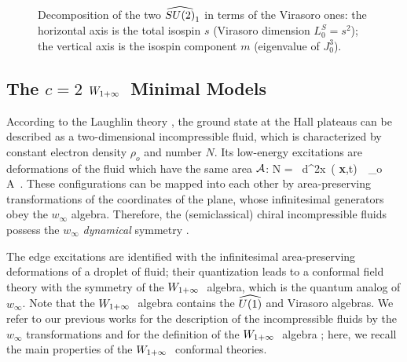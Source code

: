 \begin{figure}
\epsfxsize=10cm \centerline{}
\vspace{1cm}
\epsfxsize=10cm \centerline{}
\caption{Decomposition of the two $\su2$ \reps in terms of the Virasoro ones:
the horizontal axis is the
total isospin $s$ (Virasoro dimension $L_0^S=s^2$); the vertical axis 
is the isospin component $m$ (eigenvalue of $J^3_0$).}
\label{fig1}
\end{figure}




\subsection{The $c=2$ $W_{1+\infty}\ $ Minimal Models}

According to the Laughlin theory \cite{laugh}, 
the ground state at the Hall plateaus
can be described as a two-dimensional incompressible fluid, which is
characterized by constant electron density $\rho_o$
and number $N$. Its low-energy excitations are deformations
of the fluid which have the same area ${\cal A}$:
\beq
N = \int \ d^2x\ \rho \left( {\bf x},t\right)\ \approx\ \rho_o {\cal A}\ .
\label{keyeq}\eeq
These configurations 
can be mapped into each other by area-preserving transformations
of the coordinates of the plane, whose infinitesimal generators 
obey the $w_\infty$ algebra.
Therefore, the (semiclassical) chiral incompressible fluids possess
the $w_\infty$ {\it dynamical} symmetry \cite{ctz1} \cite{sakita}.

The edge excitations are identified with the infinitesimal 
area-preserving deformations of a droplet of fluid; 
their quantization \cite{cdtz1} leads to a conformal field theory with 
the symmetry of the $W_{1+\infty}\ $ algebra, which is the quantum analog of $w_\infty$.
Note that the $W_{1+\infty}\ $ algebra contains the $\u1$ and Virasoro algebras.
We refer to our previous works for the description
of the incompressible fluids by the $w_\infty$ transformations \cite{ctz1} and
for the definition of the $W_{1+\infty}\ $ algebra \cite{ctz4}; here, we recall 
the main properties of the $W_{1+\infty}\ $ conformal theories.

